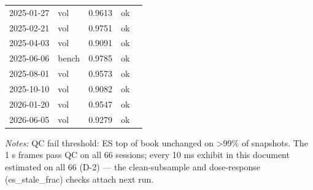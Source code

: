 \begin{table}[htbp]
\begin{tabular}{lllll}
2025-01-27 & vol & 0.9613 & ok &  \\
2025-02-21 & vol & 0.9751 & ok &  \\
2025-04-03 & vol & 0.9091 & ok &  \\
2025-06-06 & bench & 0.9785 & ok &  \\
2025-08-01 & vol & 0.9573 & ok &  \\
2025-10-10 & vol & 0.9082 & ok &  \\
2026-01-20 & vol & 0.9547 & ok &  \\
2026-06-05 & vol & 0.9279 & ok &  \\
\bottomrule
\end{tabular}
\begin{minipage}{\linewidth}\vspace{2pt}\footnotesize\emph{Notes:} QC fail threshold: ES top of book unchanged on >99\% of snapshots. The 1 s frames pass QC on all 66 sessions; every 10 ms exhibit in this document estimated on all 66 (D-2) — the clean-subsample and dose-response (es\_stale\_frac) checks attach next run.\end{minipage}
\end{table}

